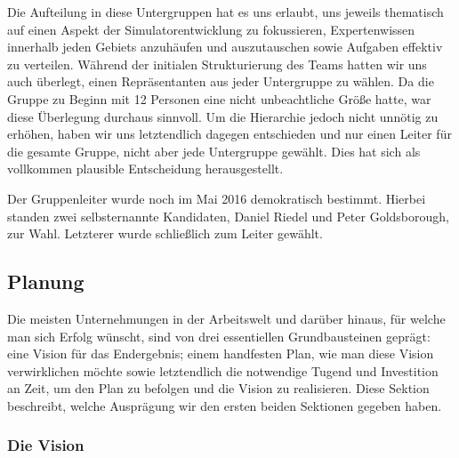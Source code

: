 Die Aufteilung in diese Untergruppen hat es uns erlaubt, uns jeweils thematisch
auf einen Aspekt der Simulatorentwicklung zu fokussieren, Expertenwissen
innerhalb jeden Gebiets anzuhäufen und auszutauschen sowie Aufgaben effektiv zu
verteilen. Während der initialen Strukturierung des Teams hatten wir uns auch
überlegt, einen Repräsentanten aus jeder Untergruppe zu wählen. Da die Gruppe zu
Beginn mit 12 Personen eine nicht unbeachtliche Größe hatte, war diese
Überlegung durchaus sinnvoll. Um die Hierarchie jedoch nicht unnötig zu erhöhen,
haben wir uns letztendlich dagegen entschieden und nur einen Leiter für die
gesamte Gruppe, nicht aber jede Untergruppe gewählt. Dies hat sich als
vollkommen plausible Entscheidung herausgestellt.

Der Gruppenleiter wurde noch im Mai 2016 demokratisch bestimmt. Hierbei standen
zwei selbsternannte Kandidaten, Daniel Riedel und Peter Goldsborough, zur Wahl.
Letzterer wurde schließlich zum Leiter gewählt.

\subsection{Planung}
\label{team:orga-plan}

Die meisten Unternehmungen in der Arbeitswelt und darüber hinaus, für welche man
sich Erfolg wünscht, sind von drei essentiellen Grundbausteinen geprägt: eine
Vision für das Endergebnis; einem handfesten Plan, wie man diese Vision
verwirklichen möchte sowie letztendlich die notwendige Tugend und Investition an
Zeit, um den Plan zu befolgen und die Vision zu realisieren. Diese Sektion
beschreibt, welche Ausprägung wir den ersten beiden Sektionen gegeben haben.

\subsubsection{Die Vision}
\label{team:orga-plan-vision}

